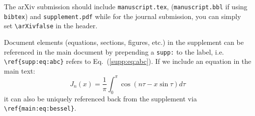 \documentclass[10pt,twocolumn,prl,aps,floatfix,superscriptaddress,longbibliography]{revtex4-1}
\def\supplementfilename{supplement}
\def\numbersupplementpages{\the\pdflastximagepages}
\newif\ifarXiv
\begin{document}
The arXiv submission should include \texttt{manuscript.tex},
(\texttt{manuscript.bbl} if using \texttt{bibtex}) and
\texttt{supplement.pdf} while for the journal submission, you can simply
set \verb!\arXivfalse! in the header.

Document elements (equations, sections, figures, etc.) in the supplement can be referenced in the main document by prepending a \texttt{supp:} to the label, i.e. \verb!\ref{supp:eq:abc}! refers to Eq.~(\ref{supp:eq:abc}). If we include an equation in the main text:
%
\begin{equation}
    J_n(x) = \frac{1}{\pi}\int_0^\pi \cos (n \tau - x \sin \tau) d\tau
\label{eq:bessel}
\end{equation}
%
it can also be uniquely referenced back from the supplement via \verb!\ref{main:eq:bessel}!.




\ifarXiv
    \foreach \x in {1,...,\numbersupplementpages}
    {
        \clearpage
        
    }
\fi
\end{document}
